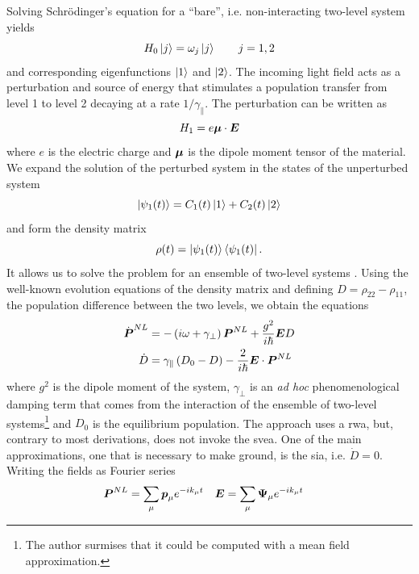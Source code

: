 Solving Schrödinger's equation for a ``bare'', i.e. non-interacting
two-level system yields
  \begin{equation}
   H_0\Ket{j}=\omega_j\Ket{j}	\qquad j=1,2
  \end{equation}
and corresponding eigenfunctions $\Ket{1}$ and $\Ket{2}$. 
The incoming light field acts as a perturbation and source of energy
that stimulates a population transfer from level 1 to level 2 decaying
at a rate $1/\gamma_\parallel$. The perturbation can be written as
  \begin{equation}
   H_1 = e\boldsymbol{\mu}\cdot\boldsymbol{E}
  \end{equation}
where $e$ is the electric charge and $\boldsymbol{\mu}$ is the 
dipole moment tensor of the material.  We expand the solution 
of the perturbed system in the states of the unperturbed system
  \begin{equation}
   \Ket{\psi_1(t)}=C_1(t)\Ket{1}+C_2(t)\Ket{2}
  \end{equation}
and form the density matrix
  \begin{equation}
   \rho(t) = \Ket{\psi_1(t)}\Bra{\psi_1(t)}.
  \end{equation}
It allows us to solve the problem for an ensemble
of two-level systems \cite{GE2010b}.
Using the well-known evolution equations of the density
matrix \cite[\S6.2]{BOY2008} and defining
$D=\rho_{22}-\rho_{11}$, the population difference between the two
levels,  we obtain the equations
\cite[\S5.3]{HAK1985b}
  \begin{align}
   \dot{\boldsymbol{P}}^{NL}	&= -\left(i\omega+\gamma_\perp\right)\boldsymbol{P}^{NL}+\frac{g^2}{i\hbar}\boldsymbol{E}D	\\
   \dot{D}				&= \gamma_\parallel\left(D_0-D\right)-\frac{2}{i\hbar}\boldsymbol{E}\cdot\boldsymbol{P}^{NL}
  \end{align}
where $g^2$ is the dipole moment of the system, 
$\gamma_\perp$ is an \textit{ad hoc} phenomenological damping
term that comes from the interaction of the ensemble of two-level systems\footnote{The author surmises that it 
could be computed with a mean field approximation.}
and $D_0$ is the equilibrium population. The approach 
uses a \gls{rwa}, but, contrary 
to most derivations, does not invoke the \gls{svea}. 
One of the main approximations, one that is necessary to make
ground, is the \gls{sia}, i.e. $\dot{D}=0$. Writing the fields
as Fourier series
	\begin{align*}
		\boldsymbol{P}^{NL}	&= \sum_{\mu}\boldsymbol{p}_\mu e^{-ik_\mu t}	&	\boldsymbol{E}	&= \sum_{\mu} \boldsymbol{\Psi}_\mu e^{-ik_\mu t}
	\end{align*}
